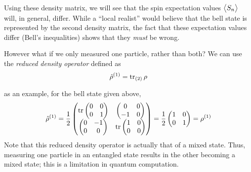 Using these density matrix, we will see that the spin expectation values \(\left\langle \begin{matrix}S_n\end{matrix} \right\rangle\) will, in general, differ. While a ``local realist'' would believe that the bell state is represented by the second density matrix, the fact that these expectation values differ (Bell's inequalities) shows that they \emph{must} be wrong.

However what if we only measured one particle, rather than both? We can use the \emph{reduced density operator} defined as
\begin{equation}
	\hat{\rho}^{(1)}=\operatorname{tr}_{(2)}\rho
\end{equation}

as an example, for the bell state given above,
\[\hat\rho^{(1)}= \frac{1}{2}\begin{pmatrix}
	\operatorname{tr} \begin{pmatrix}
		0 & 0 \\ 0 & 1
	\end{pmatrix} & \begin{pmatrix}
	0 & 0 \\ -1 & 0
	\end{pmatrix} \\ \begin{pmatrix}
	0 & -1 \\ 0 & 0
\end{pmatrix} & \operatorname{tr} \begin{pmatrix}
1 & 0 \\ 0 & 0
\end{pmatrix}
\end{pmatrix}= \frac{1}{2} \begin{pmatrix}
1 & 0 \\ 0 & 1
\end{pmatrix} = \rho^{(1)}\]
Note that this reduced density operator is actually that of a mixed state. Thus, measuring one particle in an entangled state results in the other becoming a mixed state; this is a limitation in quantum computation.


